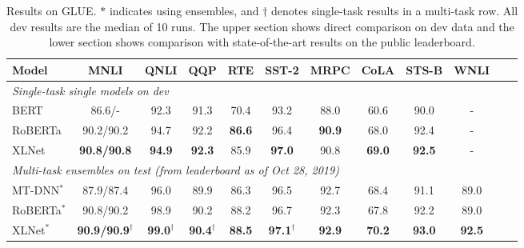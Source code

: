 \begin{table}[!h]
  \small
  \centering
  
  \begin{tabular}{lccccccccccc}
    \toprule
    \bf Model & \bf MNLI & \bf QNLI & \bf QQP & \bf RTE & \bf SST-2 & \bf MRPC & \bf CoLA & \bf STS-B & \bf WNLI \\
    \midrule
    \multicolumn{8}{l}{\it Single-task single models on dev} \\
    BERT \cite{anonymous2018bam} & 86.6/- & 92.3 & 91.3 & 70.4 & 93.2 & 88.0 & 60.6 & 90.0 & - \\
    RoBERTa \cite{liu2019roberta} & 90.2/90.2 & 94.7 & 92.2 & \bf 86.6 & 96.4 & \bf 90.9 & 68.0 & 92.4 & - \\
    XLNet & \bf 90.8/90.8 & \bf 94.9 & \bf 92.3 & 85.9 & \bf 97.0 & 90.8 & \bf 69.0 & \bf 92.5 & - \\ %
    \midrule
    \multicolumn{8}{l}{\it Multi-task ensembles on test (from leaderboard as of Oct 28, 2019)} \\
    MT-DNN$^*$ \cite{liu2019multi} & 87.9/87.4 & 96.0 & 89.9 & 86.3 & 96.5 & 92.7 & 68.4 & 91.1 & 89.0 \\
    RoBERTa$^*$ \cite{liu2019roberta} & 90.8/90.2 & 98.9 & 90.2 & 88.2 & 96.7 & 92.3 & 67.8 & 92.2 & 89.0 \\
    XLNet$^*$ & \bf 90.9/90.9$^\dagger$ & \bf 99.0$^\dagger$ & \bf 90.4$^\dagger$ & \bf 88.5 & \bf 97.1$^\dagger$ & \bf 92.9 & \bf 70.2 & \bf 93.0 & \bf 92.5 \\
    \bottomrule
  \end{tabular}
  \caption{\small
    Results on GLUE. $*$ indicates using ensembles, and $\dagger$ denotes single-task results in a multi-task row. All dev results are the median of 10 runs. The upper section shows direct comparison on dev data and the lower section shows comparison with state-of-the-art results on the public leaderboard.
  }
  \label{tab:sota-glue}
\end{table}

